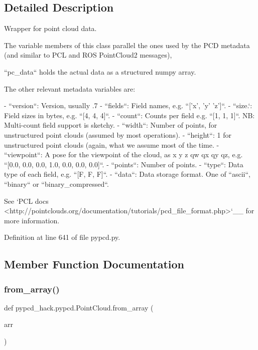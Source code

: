 \subsection{Detailed Description}
\begin{DoxyVerb}Wrapper for point cloud data.

The variable members of this class parallel the ones used by
the PCD metadata (and similar to PCL and ROS PointCloud2 messages),

``pc_data`` holds the actual data as a structured numpy array.

The other relevant metadata variables are:

- ``version``: Version, usually .7
- ``fields``: Field names, e.g. ``['x', 'y' 'z']``.
- ``size.`: Field sizes in bytes, e.g. ``[4, 4, 4]``.
- ``count``: Counts per field e.g. ``[1, 1, 1]``. NB: Multi-count field
  support is sketchy.
- ``width``: Number of points, for unstructured point clouds (assumed by
  most operations).
- ``height``: 1 for unstructured point clouds (again, what we assume most
  of the time.
- ``viewpoint``: A pose for the viewpoint of the cloud, as
  x y z qw qx qy qz, e.g. ``[0.0, 0.0, 0.0, 1.0, 0.0, 0.0, 0.0]``.
- ``points``: Number of points.
- ``type``: Data type of each field, e.g. ``[F, F, F]``.
- ``data``: Data storage format. One of ``ascii``, ``binary`` or ``binary_compressed``.

See `PCL docs <http://pointclouds.org/documentation/tutorials/pcd_file_format.php>`__
for more information.
\end{DoxyVerb}
 

Definition at line 641 of file pypcd.\+py.



\subsection{Member Function Documentation}
\mbox{\label{classpypcd__hack_1_1pypcd_1_1PointCloud_acb8878bcd215c21a0000dc0b5c083771}} 
\subsubsection{\texorpdfstring{from\+\_\+array()}{from\_array()}}
{\footnotesize\ttfamily def pypcd\+\_\+hack.\+pypcd.\+Point\+Cloud.\+from\+\_\+array (\begin{DoxyParamCaption}\item[{}]{arr }\end{DoxyParamCaption})\hspace{0.3cm}{\ttfamily [static]}}


